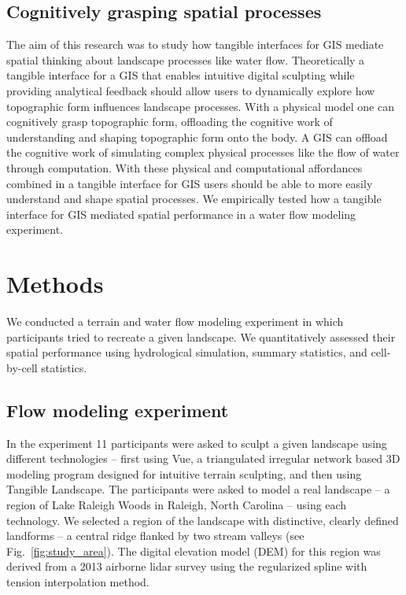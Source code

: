 \documentclass{isprs}
\begin{document}
\subsection{Cognitively grasping spatial processes}
The aim of this research was to study how tangible interfaces for GIS 
mediate spatial thinking about landscape processes like water flow. 
Theoretically a tangible interface for a GIS that enables intuitive digital sculpting while providing analytical %
feedback should allow users to dynamically explore how topographic form influences landscape processes. 
With a physical model one can 
cognitively grasp topographic form, 
offloading the cognitive work of 
understanding and shaping topographic form onto the body. 
A GIS can offload the cognitive work of simulating complex physical processes
like the flow of water through computation. 
With these physical and computational affordances combined in a tangible interface for GIS users should be able to more easily understand and shape spatial processes. 
We empirically tested how a tangible interface for GIS 
mediated spatial performance in a water flow modeling experiment. 


\section{Methods}\label{sec:methods}
%
We conducted a terrain and water flow modeling experiment 
in which participants tried to recreate a given landscape. 
%
We quantitatively assessed their spatial performance using hydrological simulation, summary statistics, and cell-by-cell statistics.

\subsection{Flow modeling experiment}
%
In the experiment 11 participants were asked to sculpt a given landscape using different technologies -- 
first using Vue, a triangulated irregular network based 3D modeling program designed for intuitive terrain sculpting, 
and then using Tangible Landscape. 
%
The participants were asked to model a real landscape --
a region of Lake Raleigh Woods 
in Raleigh, North Carolina  -- 
using each technology. 
We selected a region of the landscape with distinctive, 
clearly defined landforms -- a central ridge flanked by two stream valleys 
(see Fig.~\ref{fig:study_area}). 
The digital elevation model (DEM) for this region was derived from a 2013 airborne lidar survey using the regularized spline with tension interpolation method.
\end{document}
